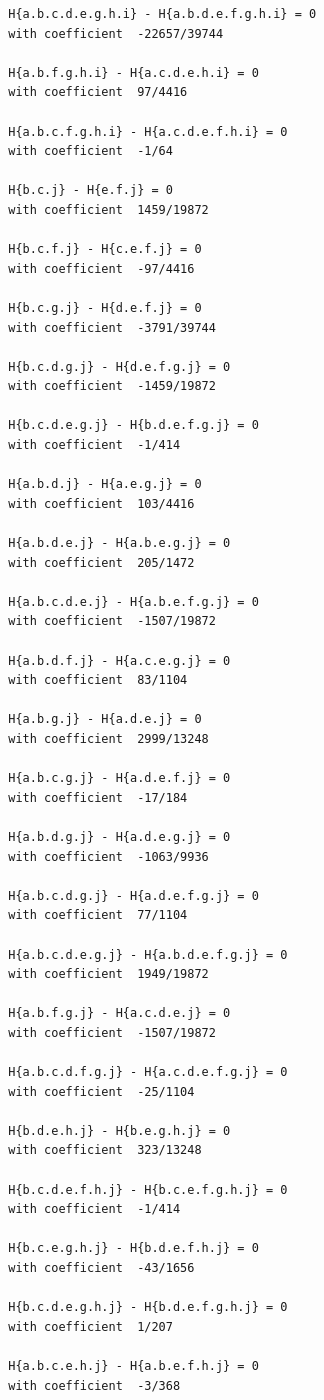 \documentclass[11pt, a4paper]{kybernetika}
\begin{document}
\begin{verbatim}
		H{a.b.c.d.e.g.h.i} - H{a.b.d.e.f.g.h.i} = 0
		with coefficient  -22657/39744
		
		H{a.b.f.g.h.i} - H{a.c.d.e.h.i} = 0
		with coefficient  97/4416
		
		H{a.b.c.f.g.h.i} - H{a.c.d.e.f.h.i} = 0
		with coefficient  -1/64
		
		H{b.c.j} - H{e.f.j} = 0
		with coefficient  1459/19872
		
		H{b.c.f.j} - H{c.e.f.j} = 0
		with coefficient  -97/4416
		
		H{b.c.g.j} - H{d.e.f.j} = 0
		with coefficient  -3791/39744
		
		H{b.c.d.g.j} - H{d.e.f.g.j} = 0
		with coefficient  -1459/19872
		
		H{b.c.d.e.g.j} - H{b.d.e.f.g.j} = 0
		with coefficient  -1/414
		
		H{a.b.d.j} - H{a.e.g.j} = 0
		with coefficient  103/4416
		
		H{a.b.d.e.j} - H{a.b.e.g.j} = 0
		with coefficient  205/1472
		
		H{a.b.c.d.e.j} - H{a.b.e.f.g.j} = 0
		with coefficient  -1507/19872
		
		H{a.b.d.f.j} - H{a.c.e.g.j} = 0
		with coefficient  83/1104
		
		H{a.b.g.j} - H{a.d.e.j} = 0
		with coefficient  2999/13248
		
		H{a.b.c.g.j} - H{a.d.e.f.j} = 0
		with coefficient  -17/184
		
		H{a.b.d.g.j} - H{a.d.e.g.j} = 0
		with coefficient  -1063/9936
		
		H{a.b.c.d.g.j} - H{a.d.e.f.g.j} = 0
		with coefficient  77/1104
		
		H{a.b.c.d.e.g.j} - H{a.b.d.e.f.g.j} = 0
		with coefficient  1949/19872
		
		H{a.b.f.g.j} - H{a.c.d.e.j} = 0
		with coefficient  -1507/19872
		
		H{a.b.c.d.f.g.j} - H{a.c.d.e.f.g.j} = 0
		with coefficient  -25/1104
		
		H{b.d.e.h.j} - H{b.e.g.h.j} = 0
		with coefficient  323/13248
		
		H{b.c.d.e.f.h.j} - H{b.c.e.f.g.h.j} = 0
		with coefficient  -1/414
		
		H{b.c.e.g.h.j} - H{b.d.e.f.h.j} = 0
		with coefficient  -43/1656
		
		H{b.c.d.e.g.h.j} - H{b.d.e.f.g.h.j} = 0
		with coefficient  1/207
		
		H{a.b.c.e.h.j} - H{a.b.e.f.h.j} = 0
		with coefficient  -3/368
		

\end{verbatim}
\end{document}
